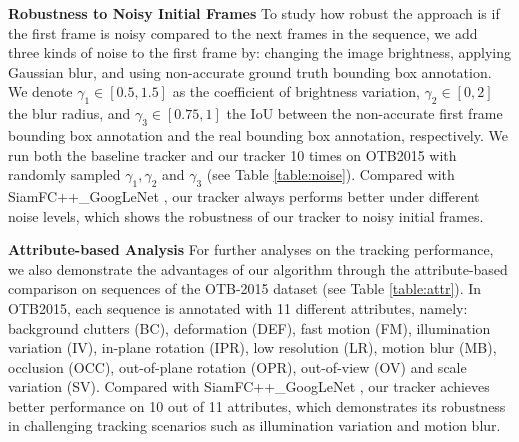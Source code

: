 \documentclass[journal]{IEEEtran}
\begin{document}

\textbf{Robustness to Noisy Initial Frames} To study how robust the approach is if the first frame is noisy compared to the next frames in the sequence, we add three kinds of noise to the first frame by: changing the image brightness, applying Gaussian blur, and using non-accurate ground truth bounding box annotation. We denote $\gamma_1 \in [0.5, 1.5]$ as the coefficient of brightness variation, $\gamma_2 \in [0, 2]$ the blur radius, and $\gamma_3 \in [0.75, 1]$ the IoU between the non-accurate first frame bounding box annotation and the real bounding box annotation, respectively. We run both the baseline tracker and our tracker 10 times on OTB2015 with randomly sampled $\gamma_1, \gamma_2$ and $\gamma_3$ (see Table \ref{table:noise}). Compared with SiamFC++\_GoogLeNet \cite{SiamFC++}, our tracker always performs better under different noise levels, which shows the robustness of our tracker to noisy initial frames.%

\textbf{Attribute-based Analysis} For further analyses on the tracking performance, we also demonstrate the advantages of our algorithm through the attribute-based comparison on sequences of the OTB-2015 dataset (see Table \ref{table:attr}). In OTB2015, each sequence is annotated with 11 different attributes, namely: background clutters (BC), deformation (DEF), fast motion (FM), illumination variation (IV), in-plane rotation (IPR), low resolution (LR), motion blur (MB), occlusion (OCC), out-of-plane rotation (OPR), out-of-view (OV) and scale variation (SV). Compared with SiamFC++\_GoogLeNet \cite{SiamFC++}, our tracker achieves better performance on 10 out of 11 attributes, which demonstrates its robustness in challenging tracking scenarios such as illumination variation and motion blur.
\vspace{-1mm}

\end{document}
